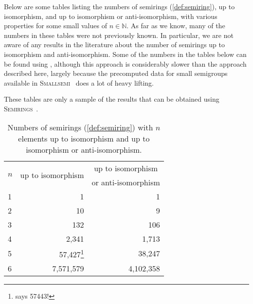 \documentclass{article}
\theoremstyle{definition}
\theoremstyle{plain}
\newcommand{\Smallsemi}{\textsc{Smallsemi}~\cite{Smallsemi}\xspace}
\newcommand{\Semirings}{\textsc{Semirings}~\cite{Semirings}\xspace}
\begin{document}
Below are some tables listing the numbers of semirings (\cref{def:semiring}),
up to isomorphism, and up to isomorphism or anti-isomorphism, with various
properties for some small values of $n\in \mathbb{N}$.
As far as we know, many of the numbers in these tables were not previously
known. In particular, we are not aware of any results in the literature about
the number of semirings up to isomorphism and anti-isomorphism.
Some of the numbers in the tables below can be found using
\cite{baueralg}, although this approach is considerably slower than the
approach described here, largely because the precomputed data for small
semigroups available in \Smallsemi does a lot of heavy lifting.

These tables are only a sample of the results that can be obtained
using \Semirings.

\begin{table}[ht]
  \centering
  \begin{tabular}{l|r|r}
    \multirow{2}{*}{$n$} & \multicolumn{1}{|c|}{\multirow{2}{*}{up to
    isomorphism}} & \multicolumn{1}{c}{up to isomorphism} \\
    & & \multicolumn{1}{l}{or anti-isomorphism}\\
    \midrule
    1 & 1                    & 1         \\
    2 & 10                   & 9         \\
    3 & 132                  & 106       \\
    4 & 2,341                & 1,713     \\
    5 & 57,427\footnote{\cite{baueralg} says 57443!}     & 38,247    \\
    6 & 7,571,579  & 4,102,358
  \end{tabular}
  \caption{Numbers of semirings (\cref{def:semiring}) with $n$ elements up to
  isomorphism and up to isomorphism or anti-isomorphism.}\label{tab:semirings}
\end{table}

\end{document}
